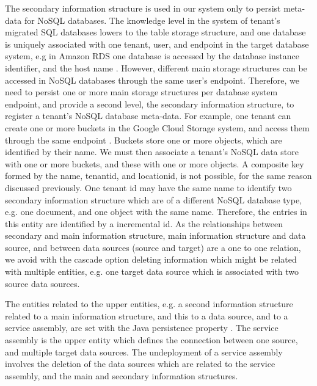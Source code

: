 The secondary information structure is used in our system only to persist meta-data for \ac{NoSQL} databases. The knowledge level in the system of tenant's migrated \ac{SQL} databases lowers to the table storage structure, and one database is uniquely associated with one tenant, user, and endpoint in the target database system, e.g in Amazon RDS one database is accessed by the database instance identifier, and the host name \cite{amazonrds}. However, different main storage structures can be accessed in \ac{NoSQL} databases through the same user's endpoint. Therefore, we need to persist one or more main storage structures per database system endpoint, and provide a second level, the secondary information structure, to register a tenant's \ac{NoSQL} database meta-data. For example, one tenant can create one or more buckets in the Google Cloud Storage system, and access them through the same endpoint \cite{googlecloudstorage}. Buckets store one or more objects, which are identified by their name. We must then associate a tenant's \ac{NoSQL} data store with one or more buckets, and these with one or more objects. A composite key formed by the name, tenantid, and locationid, is not possible, for the same reason discussed previously. One tenant id may have the same name to identify two secondary information structure which are of a different \ac{NoSQL} database type, e.g. one document, and one object with the same name. Therefore, the entries in this entity are identified by a incremental id.  As the relationships between secondary and main information structure, main information structure and data source, and between data sources (source and target) are a one to one relation, we avoid with the cascade option deleting   information which might be related with multiple entities, e.g. one target data source which is associated with two source data sources. 

The entities related to the upper entities, e.g. a second information structure related to a main information structure, and this to a data source, and to a service assembly, are set with the Java persistence property . The service assembly is the upper entity which defines the connection between one source, and multiple target data sources. The undeployment of a service assembly involves the deletion of the data sources which are related to the service assembly, and the main and secondary information structures. 

\FloatBarrier